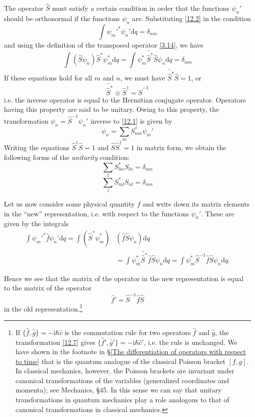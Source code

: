 The operator $\hat{S}$ must satisfy a certain condition in order that the functions $\psi_n'$ should be orthonormal if the functions $\psi_n$ are. Substituting \eqref{12.2} in the condition
\[ \int\psi_m'^*\psi_n'\mathrm{d}q=\delta_{nm} \]
and using the definition of the transposed operator \eqref{3.14}, we have
\[ \int(\hat{S}\psi_n)\hat{S}^*\psi_m^*\mathrm{d}q=\int\psi_m^*\tilde{\hat{S}^*}\hat{S}\psi_n\mathrm{d}q=\delta_{nm} \]
If these equations hold for all $ m $ and $ n $, we must have $ \tilde{\hat{S}^*}\hat{S}= 1 $, or
\begin{equation}\label{12.3}
\tilde{\hat{S}^*}\equiv\hat{S}^\dag=\hat{S}^{-1}
\end{equation}
i.e. the inverse operator is equal to the Hermitian conjugate operator. Operators having this property are said to be unitary. Owing to this property, the transformation $ \psi_n=\hat{S}^{-1}\psi_n' $ inverse to \eqref{12.1} is given by
\begin{equation}\label{12.4}
\psi_n=\sum_{m}S_{nm}^*\psi_m'
\end{equation}
Writing the equations $ \hat{S}^\dag\hat{S}= 1 $ and $ \hat{S}\hat{S}^\dag= 1 $ in matrix form, we obtain the following forms of the \textit{unitarity} condition:
\begin{equation}\label{12.5}
\sum_lS_{lm}^*S_{ln}=\delta_{mn}
\end{equation}
\begin{equation}\label{12.6}
\sum_lS_{ml}^*S_{nl}=\delta_{mn}
\end{equation}


Let us now consider some physical quantity $ f $ and write down its matrix elements in the “new” representation, i.e. with respect to the functions $\psi_n'$. These are given by the integrals
\begin{align*}
\int\psi_m'^*\hat{f}\psi_n'\mathrm{d}q=\int(\hat{S}^*\psi_m^*)&(\hat{f}\hat{S}\psi_n)\mathrm{d}q\\&=
\int\psi_m^*\tilde{\hat{S}^*}\hat{f}\hat{S}\psi_n\mathrm{d}q=\int\psi_m^*\hat{S}^{-1}\hat{f}\hat{S}\psi_n\mathrm{d}q.
\end{align*}



Hence we see that the matrix of the operator in the new representation is equal to the matrix of the operator
\begin{equation}\label{12.7}
\hat{f}'=\hat{S}^{-1}\hat{f}\hat{S}
\end{equation}
in the old representation.\footnote{If $ \{\hat{f},\hat{g} \}= -\mathrm{i}\hbar\hat{c} $ is the commutation rule for two operators $ \hat{f} $ and $ \hat{g} $, the transformation \eqref{12.7} gives $ \{\hat{f}',\hat{g}' \}= -\mathrm{i}\hbar\hat{c}' $, i.e. the rule is unchanged. We have shown in the footnote in \S\ref{The differentiation of operators with respect to time} that is the quantum analogue of the classical Poisson bracket $ \left[f, g\right] $. In classical mechanics, however, the Poisson brackets are invariant under canonical transformations of the variables (generalized coordinates and momenta); see Mechanics, \S45. In this sense we can say that unitary transformations in quantum mechanics play a role analogous to that of canonical transformations in classical mechanics.
}

